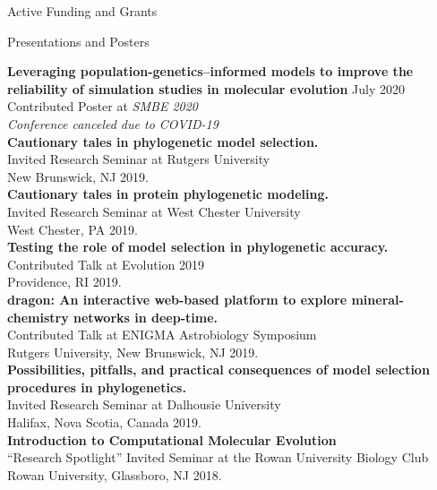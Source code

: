 \documentclass{resume} %
\begin{document}
\begin{rSection}{Active Funding and Grants}
\vspace*{0.5cm}
\begin{rSection}{Presentations and Posters}
\vspace*{0.25cm}


\textbf{Leveraging population-genetics--informed models to improve the reliability of simulation studies in molecular evolution} \hfill July 2020
\\ Contributed Poster at \emph{SMBE 2020}
\\ \emph{Conference canceled due to COVID-19} \\

\textbf{Cautionary tales in phylogenetic model selection.}
\\ Invited Research Seminar at Rutgers University
\\ New Brunswick, NJ 2019.\\


\textbf{Cautionary tales in protein phylogenetic modeling.}
\\ Invited Research Seminar at West Chester University
\\ West Chester, PA 2019.\\


\textbf{Testing the role of model selection in phylogenetic accuracy.}
\\ Contributed Talk at Evolution 2019
\\ Providence, RI 2019.\\

\textbf{dragon: An interactive web-based platform to explore mineral-chemistry networks in deep-time.}
\\ Contributed Talk at ENIGMA Astrobiology Symposium
\\ Rutgers University, New Brunswick, NJ 2019.\\


\textbf{Possibilities, pitfalls, and practical consequences of model selection procedures in phylogenetics.}
\\Invited Research Seminar at Dalhousie University
\\ Halifax, Nova Scotia, Canada 2019.\\

\textbf{Introduction to Computational Molecular Evolution}
\\``Research Spotlight'' Invited Seminar at the Rowan University Biology Club
\\ Rowan University, Glassboro, NJ 2018.\\


\end{rSection}
\end{rSection}
\end{document}
